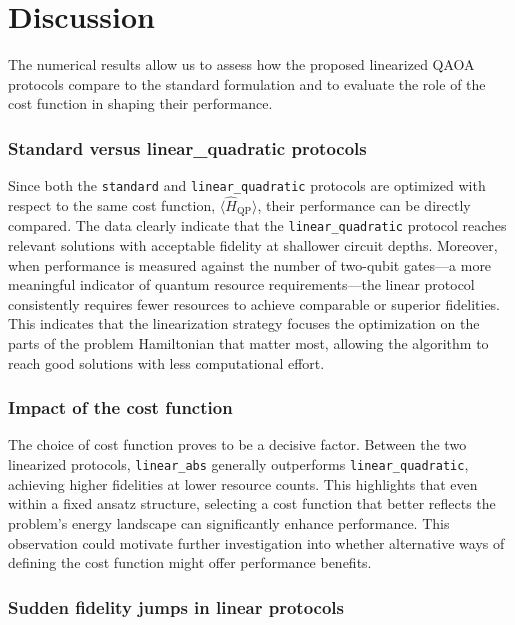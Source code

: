 \chapter{Discussion}
\label{Chapter:Discussion}

The numerical results allow us to assess how the proposed linearized QAOA protocols compare
to the standard formulation and to evaluate the role of the cost function in shaping their
performance.

\subsection*{Standard versus linear\_quadratic protocols}

Since both the \texttt{standard} and \texttt{linear\_quadratic} protocols are optimized with respect to the same cost function, $\langle \hat{H}_\mathrm{QP} \rangle$, their performance can be directly compared.  
The data clearly indicate that the \texttt{linear\_quadratic} protocol reaches relevant solutions with acceptable fidelity at shallower circuit depths. Moreover, when performance is measured against the number of two-qubit gates—a more meaningful indicator of quantum resource requirements—the linear protocol consistently requires fewer resources to achieve comparable or superior fidelities.  
This indicates that the linearization strategy focuses the optimization on the parts of the problem Hamiltonian that matter most, allowing the algorithm to reach good solutions with less computational effort.

\subsection*{Impact of the cost function}

The choice of cost function proves to be a decisive factor.  
Between the two linearized protocols, \texttt{linear\_abs} generally outperforms \texttt{linear\_quadratic}, achieving higher fidelities at lower resource counts.  
This highlights that even within a fixed ansatz structure, selecting a cost function that better reflects the problem’s energy landscape can significantly enhance performance.  
This observation could motivate further investigation into whether alternative ways of defining the cost function might offer performance benefits.

\subsection*{Sudden fidelity jumps in linear protocols}

